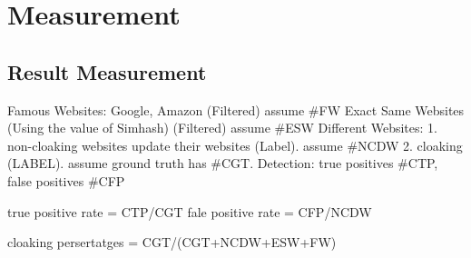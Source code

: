 \section{Measurement}
\label{s: measurement}
	\subsection{Result Measurement}
	Famous Websites: Google, Amazon (Filtered) assume #FW
	Exact Same Websites (Using the value of Simhash) (Filtered) assume #ESW
	Different Websites: 1. non-cloaking websites update their websites (Label). assume #NCDW
			    2. cloaking (LABEL). assume ground truth has #CGT.
	Detection: true positives #CTP, false positives #CFP
	
	true positive rate = CTP/CGT
	fale positive rate = CFP/NCDW

	cloaking persertatges = CGT/(CGT+NCDW+ESW+FW)



	

	
